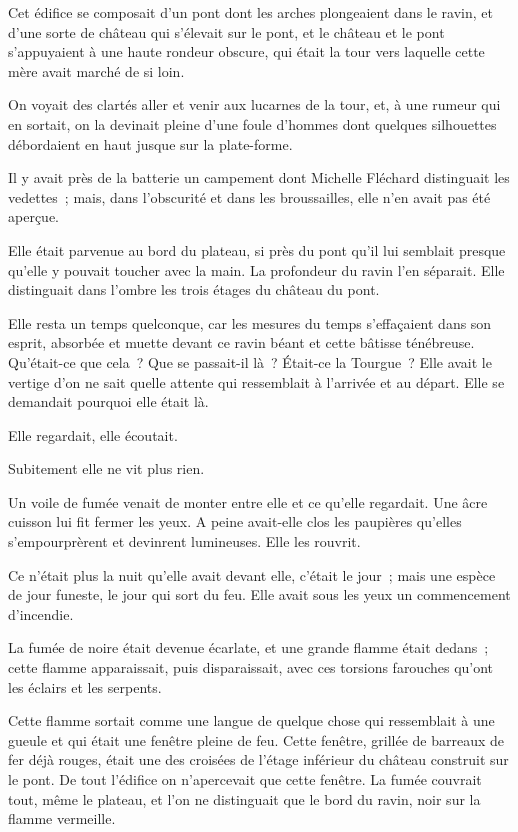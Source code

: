 \documentclass[french,twoside]{book} %
\begin{document}
Cet édifice se composait d’un pont dont les arches plongeaient dans le ravin, et d’une sorte de château qui s’élevait sur le pont, et le château et le pont s’appuyaient à une haute rondeur obscure, qui était la tour vers laquelle cette mère avait marché de si loin.\par
On voyait des clartés aller et venir aux lucarnes de la tour, et, à une rumeur qui en sortait, on la devinait pleine d’une foule d’hommes dont quelques silhouettes débordaient en haut jusque sur la plate-forme.\par
Il y avait près de la batterie un campement dont Michelle Fléchard distinguait les vedettes ; mais, dans l’obscurité et dans les broussailles, elle n’en avait pas été aperçue.\par
Elle était parvenue au bord du plateau, si près du pont qu’il lui semblait presque qu’elle y pouvait toucher avec la main. La profondeur du ravin l’en séparait. Elle distinguait dans l’ombre les trois étages du château du pont.\par
Elle resta un temps quelconque, car les mesures du temps s’effaçaient dans son esprit, absorbée et muette devant ce ravin béant et cette bâtisse ténébreuse. Qu’était-ce que cela ? Que se passait-il là ? Était-ce la Tourgue ? Elle avait le vertige d’on ne sait quelle attente qui ressemblait à l’arrivée et au départ. Elle se demandait pourquoi elle était là.\par
Elle regardait, elle écoutait.\par
Subitement elle ne vit plus rien.\par
Un voile de fumée venait de monter entre elle et ce  qu’elle regardait. Une âcre cuisson lui fit fermer les yeux. A peine avait-elle clos les paupières qu’elles s’empourprèrent et devinrent lumineuses. Elle les rouvrit.\par
Ce n’était plus la nuit qu’elle avait devant elle, c’était le jour ; mais une espèce de jour funeste, le jour qui sort du feu. Elle avait sous les yeux un commencement d’incendie.\par
La fumée de noire était devenue écarlate, et une grande flamme était dedans ; cette flamme apparaissait, puis disparaissait, avec ces torsions farouches qu’ont les éclairs et les serpents.\par
Cette flamme sortait comme une langue de quelque chose qui ressemblait à une gueule et qui était une fenêtre pleine de feu. Cette fenêtre, grillée de barreaux de fer déjà rouges, était une des croisées de l’étage inférieur du château construit sur le pont. De tout l’édifice on n’apercevait que cette fenêtre. La fumée couvrait tout, même le plateau, et l’on ne distinguait que le bord du ravin, noir sur la flamme vermeille.\par
\end{document}
